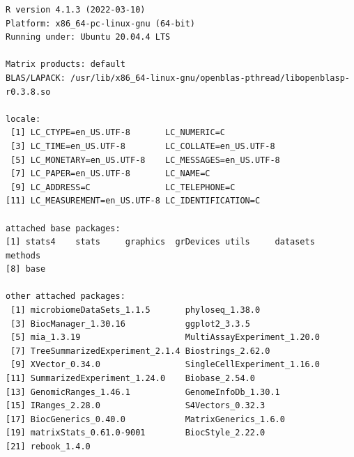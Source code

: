 \documentclass[
]{book}
\begin{document}
\begin{verbatim}
R version 4.1.3 (2022-03-10)
Platform: x86_64-pc-linux-gnu (64-bit)
Running under: Ubuntu 20.04.4 LTS

Matrix products: default
BLAS/LAPACK: /usr/lib/x86_64-linux-gnu/openblas-pthread/libopenblasp-r0.3.8.so

locale:
 [1] LC_CTYPE=en_US.UTF-8       LC_NUMERIC=C              
 [3] LC_TIME=en_US.UTF-8        LC_COLLATE=en_US.UTF-8    
 [5] LC_MONETARY=en_US.UTF-8    LC_MESSAGES=en_US.UTF-8   
 [7] LC_PAPER=en_US.UTF-8       LC_NAME=C                 
 [9] LC_ADDRESS=C               LC_TELEPHONE=C            
[11] LC_MEASUREMENT=en_US.UTF-8 LC_IDENTIFICATION=C       

attached base packages:
[1] stats4    stats     graphics  grDevices utils     datasets  methods  
[8] base     

other attached packages:
 [1] microbiomeDataSets_1.1.5       phyloseq_1.38.0               
 [3] BiocManager_1.30.16            ggplot2_3.3.5                 
 [5] mia_1.3.19                     MultiAssayExperiment_1.20.0   
 [7] TreeSummarizedExperiment_2.1.4 Biostrings_2.62.0             
 [9] XVector_0.34.0                 SingleCellExperiment_1.16.0   
[11] SummarizedExperiment_1.24.0    Biobase_2.54.0                
[13] GenomicRanges_1.46.1           GenomeInfoDb_1.30.1           
[15] IRanges_2.28.0                 S4Vectors_0.32.3              
[17] BiocGenerics_0.40.0            MatrixGenerics_1.6.0          
[19] matrixStats_0.61.0-9001        BiocStyle_2.22.0              
[21] rebook_1.4.0                  


\end{verbatim}
\end{document}
